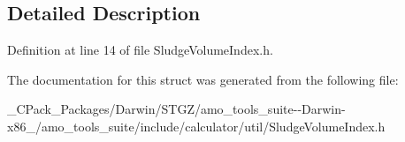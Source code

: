 \subsection{Detailed Description}


Definition at line 14 of file Sludge\+Volume\+Index.\+h.



The documentation for this struct was generated from the following file\+:\begin{DoxyCompactItemize}
\item 
\+\_\+\+C\+Pack\+\_\+\+Packages/\+Darwin/\+S\+T\+G\+Z/amo\+\_\+tools\+\_\+suite-\/-\/\+Darwin-\/x86\+\_/amo\+\_\+tools\+\_\+suite/include/calculator/util/Sludge\+Volume\+Index.\+h\end{DoxyCompactItemize}
